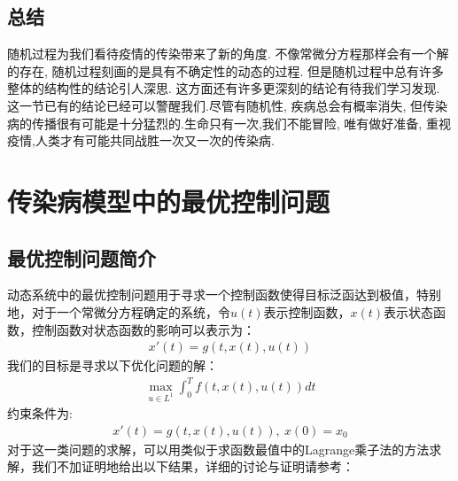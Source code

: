 \documentclass[UTF8]{ctexart}
\begin{document}
		\subsection{总结}
			随机过程为我们看待疫情的传染带来了新的角度. 不像常微分方程那样会有一个解的存在, 随机过程刻画的是具有不确定性的动态的过程. 但是随机过程中总有许多整体的结构性的结论引人深思. 这方面还有许多更深刻的结论有待我们学习发现. 
			这一节已有的结论已经可以警醒我们.尽管有随机性, 疾病总会有概率消失, 但传染病的传播很有可能是十分猛烈的.生命只有一次,我们不能冒险, 唯有做好准备, 重视疫情,人类才有可能共同战胜一次又一次的传染病.
	\section{传染病模型中的最优控制问题}
		\subsection{最优控制问题简介}
			\indent 动态系统中的最优控制问题用于寻求一个控制函数使得目标泛函达到极值，特别地，对于一个常微分方程确定的系统，令$u(t)$表示控制函数，$x(t)$表示状态函数，控制函数对状态函数的影响可以表示为：
			\begin{equation}
			\begin{aligned}
			x'(t)=g(t,x(t),u(t))
			\end{aligned}
			\end{equation}
			\indent 我们的目标是寻求以下优化问题的解：
			\begin{equation}
			\begin{aligned}
			\max_{u\in L^1} \int_{0}^{T}f(t,x(t),u(t))dt
			\end{aligned}
			\end{equation}
			\indent 约束条件为:
			\begin{equation}
			\begin{aligned}
			x'(t)=g(t,x(t),u(t)),\ x(0)=x_0
			\end{aligned}
			\end{equation}
			\indent 对于这一类问题的求解，可以用类似于求函数最值中的Lagrange乘子法的方法求解，我们不加证明地给出以下结果，详细的讨论与证明请参考\cite{ref1}：
\end{document}
